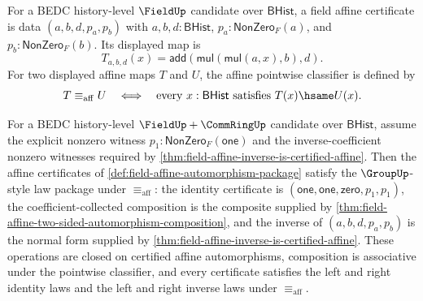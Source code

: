 \begin{definition}
\label{def:field-affine-automorphism-package}
For a BEDC history-level $\FieldUp$ candidate over $\mathsf{BHist}$, a field
affine certificate is data
$(a,b,d,p_a,p_b)$ with $a,b,d:\mathsf{BHist}$,
$p_a:\mathsf{NonZero}_F(a)$, and $p_b:\mathsf{NonZero}_F(b)$. Its displayed
map is
$$
T_{a,b,d}(x)=\mathsf{add}(\mathsf{mul}(\mathsf{mul}(a,x),b),d).
$$
For two displayed affine maps $T$ and $U$, the affine pointwise classifier is
defined by
$$
T\equiv_{\mathrm{aff}} U
\quad\Longleftrightarrow\quad
\text{every }x:\mathsf{BHist}\text{ satisfies }T(x)\hsame U(x).
$$
\end{definition}

\begin{theorem}
\label{thm:field-affine-automorphism-group-package}
For a BEDC history-level $\FieldUp+\CommRingUp$ candidate over
$\mathsf{BHist}$, assume the explicit nonzero witness
$p_1:\mathsf{NonZero}_F(\mathsf{one})$ and the inverse-coefficient nonzero
witnesses required by
\autoref{thm:field-affine-inverse-is-certified-affine}. Then the affine
certificates of \autoref{def:field-affine-automorphism-package} satisfy the
$\GroupUp$-style law package under $\equiv_{\mathrm{aff}}$: the identity
certificate is
$(\mathsf{one},\mathsf{one},\mathsf{zero},p_1,p_1)$, the coefficient-collected
composition is the composite supplied by
\autoref{thm:field-affine-two-sided-automorphism-composition}, and the inverse
of $(a,b,d,p_a,p_b)$ is the normal form supplied by
\autoref{thm:field-affine-inverse-is-certified-affine}. These operations are
closed on certified affine automorphisms, composition is associative under the
pointwise classifier, and every certificate satisfies the left and right
identity laws and the left and right inverse laws under
$\equiv_{\mathrm{aff}}$.
\end{theorem}
